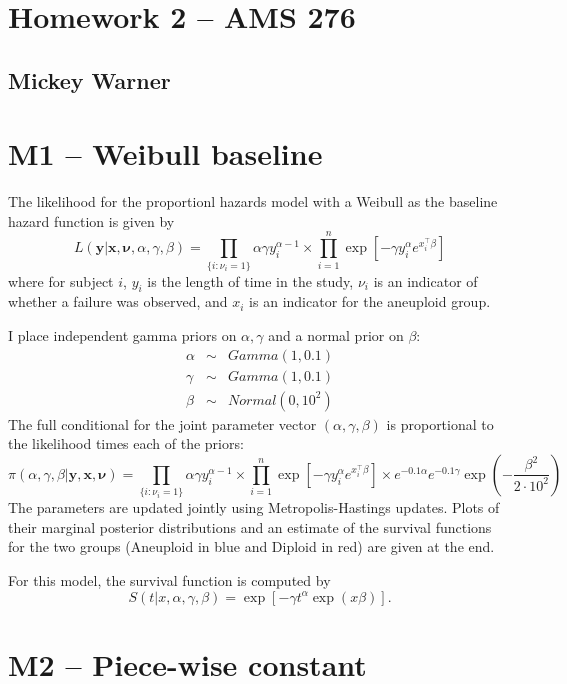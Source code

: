 \documentclass[12pt]{article}
\newcommand{\m}[1]{\mathbf{\bm{#1}}}
\begin{document}
\section*{Homework 2 -- AMS 276}
\subsection*{Mickey Warner}
\bigskip
\bigskip

\section*{M1 -- Weibull baseline}

\noindent The likelihood for the proportionl hazards model with a Weibull as the baseline hazard function is given by
\[ L(\m{y}|\m{x},\m{\nu},\alpha,\gamma,\beta) = \prod_{\{i:\nu_i=1\}} \alpha\gamma y_i^{\alpha-1} \times \prod_{i=1}^n\exp\left[-\gamma y_i^\alpha e^{x_i^\top\beta}\right] \]
\noindent where for subject $i$, $y_i$ is the length of time in the study, $\nu_i$ is an indicator of whether a failure was observed, and $x_i$ is an indicator for the aneuploid group.
\bigskip

\noindent I place independent gamma priors on $\alpha,\gamma$ and a normal prior on $\beta$:
\begin{eqnarray*}
\alpha &\sim& Gamma(1, 0.1) \\
\gamma &\sim& Gamma(1, 0.1) \\
\beta &\sim& Normal(0, 10^2)
\end{eqnarray*}
\noindent The full conditional for the joint parameter vector $(\alpha, \gamma, \beta)$ is proportional to the likelihood times each of the priors:
\[ \pi(\alpha,\gamma,\beta|\m{y},\m{x},\m{\nu}) = \prod_{\{i:\nu_i=1\}} \alpha\gamma y_i^{\alpha-1} \times \prod_{i=1}^n\exp\left[-\gamma y_i^\alpha e^{x_i^\top\beta}\right]\times e^{-0.1\alpha}e^{-0.1\gamma}\exp\left(-\frac{\beta^2}{2\cdot10^2}\right) \]
\noindent The parameters are updated jointly using Metropolis-Hastings updates. Plots of their marginal posterior distributions and an estimate of the survival functions for the two groups (Aneuploid in blue and Diploid in red) are given at the end.
\bigskip

\noindent For this model, the survival function is computed by
\[ S(t|x,\alpha,\gamma,\beta)=\exp\left[-\gamma t^\alpha \exp\left(x\beta\right)\right]. \]

\section*{M2 -- Piece-wise constant}
\end{document}
